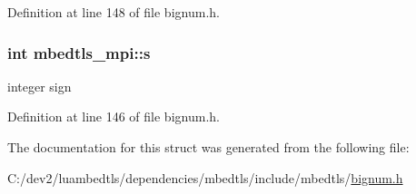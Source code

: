 Definition at line 148 of file bignum.\-h.

\hypertarget{structmbedtls__mpi_a98e0b295f053643085b1c756857c3477}{
\subsubsection[{s}]{\setlength{\rightskip}{0pt plus 5cm}int mbedtls\-\_\-mpi\-::s}}\label{structmbedtls__mpi_a98e0b295f053643085b1c756857c3477}
integer sign 

Definition at line 146 of file bignum.\-h.



The documentation for this struct was generated from the following file\-:\begin{DoxyCompactItemize}
\item 
C\-:/dev2/luambedtls/dependencies/mbedtls/include/mbedtls/\hyperlink{bignum_8h}{bignum.\-h}\end{DoxyCompactItemize}
